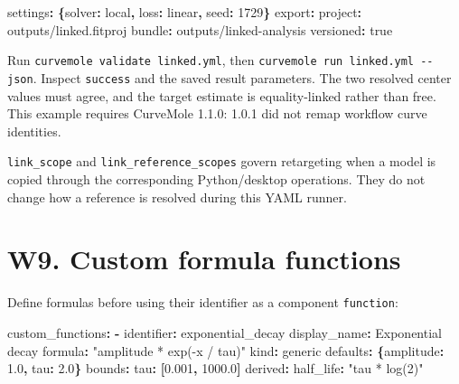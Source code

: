 \documentclass[
  10pt,
  a4paper,
  oneside]{scrreprt}
\newenvironment{Shaded}{}{}
\newcommand{\AttributeTok}[1]{\textcolor[rgb]{0.49,0.56,0.16}{#1}}
\newcommand{\CharTok}[1]{\textcolor[rgb]{0.25,0.44,0.63}{#1}}
\newcommand{\DecValTok}[1]{\textcolor[rgb]{0.25,0.63,0.44}{#1}}
\newcommand{\FloatTok}[1]{\textcolor[rgb]{0.25,0.63,0.44}{#1}}
\newcommand{\FunctionTok}[1]{\textcolor[rgb]{0.02,0.16,0.49}{#1}}
\newcommand{\KeywordTok}[1]{\textcolor[rgb]{0.00,0.44,0.13}{\textbf{#1}}}
\newcommand{\StringTok}[1]{\textcolor[rgb]{0.25,0.44,0.63}{#1}}
\begin{document}
\begin{Shaded}
\begin{Highlighting}[]
\AttributeTok{  }\FunctionTok{settings}\KeywordTok{:}\AttributeTok{ }\KeywordTok{\{}\FunctionTok{solver}\KeywordTok{:}\AttributeTok{ local}\KeywordTok{,}\AttributeTok{ }\FunctionTok{loss}\KeywordTok{:}\AttributeTok{ linear}\KeywordTok{,}\AttributeTok{ }\FunctionTok{seed}\KeywordTok{:}\AttributeTok{ }\DecValTok{1729}\KeywordTok{\}}
\FunctionTok{export}\KeywordTok{:}
\AttributeTok{  }\FunctionTok{project}\KeywordTok{:}\AttributeTok{ outputs/linked.fitproj}
\AttributeTok{  }\FunctionTok{bundle}\KeywordTok{:}\AttributeTok{ outputs/linked{-}analysis}
\AttributeTok{  }\FunctionTok{versioned}\KeywordTok{:}\AttributeTok{ }\CharTok{true}
\end{Highlighting}
\end{Shaded}

Run \texttt{curvemole\ validate\ linked.yml}, then
\texttt{curvemole\ run\ linked.yml\ -\/-json}. Inspect \texttt{success}
and the saved result parameters. The two resolved center values must
agree, and the target estimate is equality-linked rather than free. This
example requires CurveMole 1.1.0: 1.0.1 did not remap workflow curve
identities.

\texttt{link\_scope} and \texttt{link\_reference\_scopes} govern
retargeting when a model is copied through the corresponding
Python/desktop operations. They do not change how a reference is
resolved during this YAML runner.

\hypertarget{w9.-custom-formula-functions}{%
\section{W9. Custom formula
functions}\label{w9.-custom-formula-functions}}

Define formulas before using their identifier as a component
\texttt{function}:

\begin{Shaded}
\begin{Highlighting}[]
\FunctionTok{custom\_functions}\KeywordTok{:}
\AttributeTok{  }\KeywordTok{{-}}\AttributeTok{ }\FunctionTok{identifier}\KeywordTok{:}\AttributeTok{ exponential\_decay}
\AttributeTok{    }\FunctionTok{display\_name}\KeywordTok{:}\AttributeTok{ Exponential decay}
\AttributeTok{    }\FunctionTok{formula}\KeywordTok{:}\AttributeTok{ }\StringTok{"amplitude * exp({-}x / tau)"}
\AttributeTok{    }\FunctionTok{kind}\KeywordTok{:}\AttributeTok{ generic}
\AttributeTok{    }\FunctionTok{defaults}\KeywordTok{:}\AttributeTok{ }\KeywordTok{\{}\FunctionTok{amplitude}\KeywordTok{:}\AttributeTok{ }\FloatTok{1.0}\KeywordTok{,}\AttributeTok{ }\FunctionTok{tau}\KeywordTok{:}\AttributeTok{ }\FloatTok{2.0}\KeywordTok{\}}
\AttributeTok{    }\FunctionTok{bounds}\KeywordTok{:}
\AttributeTok{      }\FunctionTok{tau}\KeywordTok{:}\AttributeTok{ }\KeywordTok{[}\FloatTok{0.001}\KeywordTok{,}\AttributeTok{ }\FloatTok{1000.0}\KeywordTok{]}
\AttributeTok{    }\FunctionTok{derived}\KeywordTok{:}
\AttributeTok{      }\FunctionTok{half\_life}\KeywordTok{:}\AttributeTok{ }\StringTok{"tau * log(2)"}
\end{Highlighting}
\end{Shaded}
\end{document}

